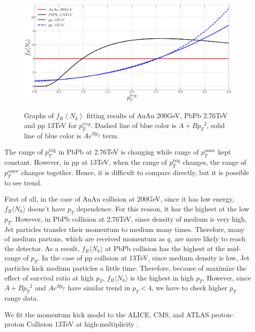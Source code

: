 \documentclass[%
 reprint,
 amsmath,amssymb,
 aps,
]{revtex4-2}
\begin{document}
\begin{figure}[ht]
\centering
\includegraphics[width=12cm, height=6cm]{Paper_frnk}
\caption{Graphs of $f_R \left\langle N_k \right\rangle$ fitting results of AuAu 200GeV, PbPb 2.76TeV and pp 13TeV for $p_{T}^{trig}$.
Dashed line of blue color is $A+B{p_T}^2$, solid line of blue color is $Ae^{Bp_T}$ term.}
\label{figure:frnk}
\end{figure}

The range of $p_T^{\text{trig}}$ in PbPb at 2.76TeV is changing while range of $p_T^{\text{assoc}}$ kept constant.
However, in pp at 13TeV, when the range of $p_T^{\text{trig}}$ changes, the range of $p_T^{\text{assoc}}$ changes together.
Hence, it is difficult to compare directly, but it is possible to see trend.

First of all, in the case of AuAu collision at 200GeV, since it has low energy, $f_R \langle N_k \rangle$ doens't have $p_T$ dependence.
For this reason, it has the highest at the low $p_T$.
However, in PbPb collision at 2.76TeV, since density of medium is very high, Jet particles transfer their momentum to medium many times.
Therefore, many of medium partons, which are received momentum as $q$, are more likely to reach the detector.
As a result, $f_R \langle N_k \rangle$ at PbPb collision has the highest at the mid-range of $p_T$.
In the case of pp collision at 13TeV, since medium density is low, Jet particles kick medium particles a little time.
Therefore, because of maximize the effect of survival ratio at high $p_T$, $f_R \langle N_k \rangle$ is the highest in high $p_T$.
However, since $A+B{p_T}^2$ and $Ae^{Bp_T}$ have similar trend in $p_T<4$, we have to check higher $p_T$ range data.

We fit the momentum kick model to the ALICE, CMS, and ATLAS proton-proton Collision 13TeV at high-multiplicity \cite{alice, cms, atlas}. 
\end{document}
